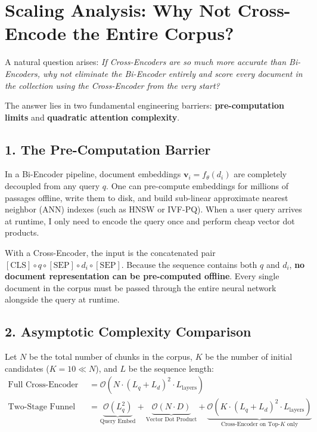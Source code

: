 \documentclass[11pt,a4paper]{article}
\begin{document}
\clearpage
\section{Scaling Analysis: Why Not Cross-Encode the Entire Corpus?}

A natural question arises: \textit{If Cross-Encoders are so much more accurate than Bi-Encoders, why not eliminate the Bi-Encoder entirely and score every document in the collection using the Cross-Encoder from the very start?}

The answer lies in two fundamental engineering barriers: \textbf{pre-computation limits} and \textbf{quadratic attention complexity}.

\subsection{1. The Pre-Computation Barrier}
In a Bi-Encoder pipeline, document embeddings $\mathbf{v}_i = f_\theta(d_i)$ are completely decoupled from any query $q$. One can pre-compute embeddings for millions of passages offline, write them to disk, and build sub-linear approximate nearest neighbor (ANN) indexes (such as HNSW or IVF-PQ). When a user query arrives at runtime, I only need to encode the query once and perform cheap vector dot products.

With a Cross-Encoder, the input is the concatenated pair $[\text{CLS}] \circ q \circ [\text{SEP}] \circ d_i \circ [\text{SEP}]$. Because the sequence contains both $q$ and $d_i$, \textbf{no document representation can be pre-computed offline}. Every single document in the corpus must be passed through the entire neural network alongside the query at runtime.

\subsection{2. Asymptotic Complexity Comparison}
Let $N$ be the total number of chunks in the corpus, $K$ be the number of initial candidates ($K=10 \ll N$), and $L$ be the sequence length:
\begin{align}
    \text{Full Cross-Encoder Complexity} &= \mathcal{O}\left(N \cdot (L_q + L_d)^2 \cdot L_{\text{layers}}\right) \\
    \text{Two-Stage Funnel Complexity} &= \underbrace{\mathcal{O}\left(L_q^2\right)}_{\text{Query Embed}} + \underbrace{\mathcal{O}\left(N \cdot D\right)}_{\text{Vector Dot Product}} + \underbrace{\mathcal{O}\left(K \cdot (L_q + L_d)^2 \cdot L_{\text{layers}}\right)}_{\text{Cross-Encoder on Top-}K \text{ only}}
\end{align}
\end{document}
